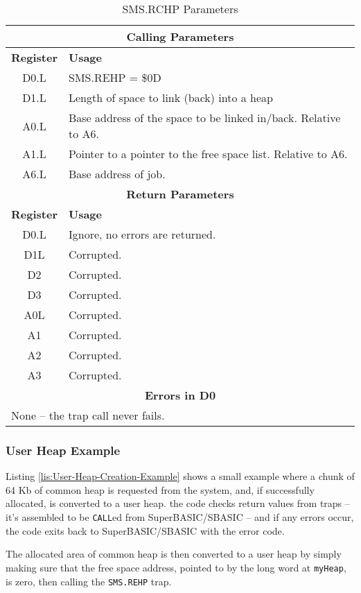 \begin{table}[!h]
\begin{centering}
\begin{tabular}{|c|>{\raggedright}p{}|}
\hline 
\multicolumn{2}{|c|}{\textbf{Calling Parameters}}\tabularnewline
\hline 
\textbf{Register} & \textbf{Usage}\tabularnewline
\hline 
D0.L & SMS.REHP = \$0D\tabularnewline
\hline 
D1.L & Length of space to link (back) into a heap\tabularnewline
\hline 
A0.L & Base address of the space to be linked in/back. Relative to A6.\tabularnewline
\hline 
A1.L & Pointer to a pointer to the free space list. Relative to A6.\tabularnewline
\hline 
A6.L & Base address of job.\tabularnewline
\hline 
\multicolumn{2}{|c|}{\textbf{Return Parameters}}\tabularnewline
\hline 
\textbf{Register} & \textbf{Usage}\tabularnewline
\hline 
D0.L & Ignore, no errors are returned.\tabularnewline
\hline 
D1L & Corrupted.\tabularnewline
\hline 
D2 & Corrupted.\tabularnewline
\hline 
D3 & Corrupted.\tabularnewline
\hline 
A0L & Corrupted.\tabularnewline
\hline 
A1 & Corrupted.\tabularnewline
\hline 
A2 & Corrupted.\tabularnewline
\hline 
A3 & Corrupted.\tabularnewline
\hline 
\multicolumn{2}{|c|}{\textbf{Errors in D0}}\tabularnewline
\hline 
\multicolumn{2}{|l|}{None -- the trap call never fails.}\tabularnewline
\hline 
\end{tabular}
\par\end{centering}
\caption{SMS.RCHP Parameters\label{tab:SMS.RCHP-Parameters-1}}
\end{table}


\subsubsection{User Heap Example}

Listing \ref{lis:User-Heap-Creation-Example} shows a small example
where a chunk of 64 Kb of common heap is requested from the system,
and, if successfully allocated, is converted to a user heap. the code
checks return values from traps -- it's assembled to be \texttt{CALL}ed
from SuperBASIC/SBASIC -- and if any errors occur, the code exits
back to SuperBASIC/SBASIC with the error code.

The allocated area of common heap is then converted to a user heap
by simply making sure that the free space address, pointed to by the
long word at \texttt{myHeap}, is zero, then calling the \texttt{SMS.REHP}
trap.

